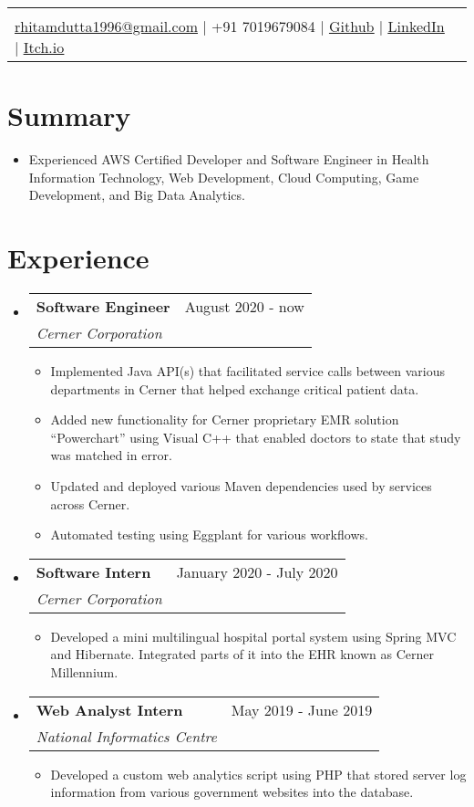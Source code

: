\documentclass[letterpaper,11pt]{article}
\makeatletter
\newcommand{\sectionStart}{
  \begin{itemize}[label={},leftmargin=0in]
}
\newcommand{\sectionEnd}{
  \end{itemize}
}
\newcommand{\head}[7]{
  \noindent
  \begin{tabular*}{\textwidth}{l@{\extracolsep{\fill}}r}
    \centerline{
      \textbf{\href{#1}{\color{blue}{\LARGE {\underline{#2}}}}}
    }
    \vspace{5pt}\\
    \centerline{
      \href{mailto:#3}{\underline{#3}} $\mid$
      #4 $\mid$
       \href{#5}{\underline{Github}} $\mid$
       \href{#6}{\underline{LinkedIn}} $\mid$
       \href{#7}{\underline{Itch.io}}
    }
  \end{tabular*}
  \vspace{-10pt}
}
\newcommand{\summaryText}[1]{
  \item
  \begin{addmargin}[7pt]{0pt}
    {#1}
  \end{addmargin}
}
\newcommand{\jobHeading}[3]{
  \vspace{-1pt}
  \item
  \begin{tabular*}{1.0\textwidth}{l@{\extracolsep{\fill}}r@{}}
    \normalsize{\textbf{#1}} & #2 \\
    \textit{\small#3} \\
  \end{tabular*}\vspace{-5pt}
}
\newcommand{\listStart}{\begin{itemize}}
\newcommand{\listEnd}{\end{itemize}\vspace{-5pt}}
\newcommand{\bulletItem}[1]{
  \item
  \small{
    {#1 \vspace{-1.8pt}}
  }
}
\makeatother
\begin{document}
\head
  {https://rhitamdutta.com/} %
  {Rhitam Dutta} %
  {rhitamdutta1996@gmail.com} %
  {+91 7019679084} %
  {https://github.com/exthazor} %
  {https://www.linkedin.com/in/rhitam-dutta} %
  {https://www.capt-entropy.itch.io} %


\section{Summary}
\sectionStart
  \summaryText
  {Experienced AWS Certified Developer and Software Engineer in Health Information Technology, Web Development, Cloud Computing, Game Development, and Big Data Analytics.}
\sectionEnd

\section{Experience}
\sectionStart
  \jobHeading
    {Software Engineer}
    {August 2020 - now}
    {Cerner Corporation}
  \listStart
    \bulletItem
    {Implemented Java API(s) that facilitated service calls between various departments in Cerner that helped exchange critical patient data.}
    \bulletItem
    {Added new functionality for Cerner proprietary EMR solution “Powerchart” using Visual C++ that enabled doctors to state that study was matched in error.}
   \bulletItem
    {Updated and deployed various Maven dependencies used by services across Cerner.}
   \bulletItem
   {Automated testing using Eggplant for various workflows.}
   \listEnd
  \jobHeading
    {Software Intern} 
    {January 2020 - July 2020}
    {Cerner Corporation}
  \listStart
    \bulletItem
    {Developed a mini multilingual hospital portal system using Spring MVC and Hibernate. Integrated parts of it into the EHR known as Cerner Millennium.}
  \listEnd
  \jobHeading
    {Web Analyst Intern} 
    {May 2019 - June 2019}
    {National Informatics Centre}
  \listStart
    \bulletItem
    {Developed a custom web analytics script using PHP that stored server log information from various government websites into the database.}
  \listEnd
\sectionEnd

\end{document}
